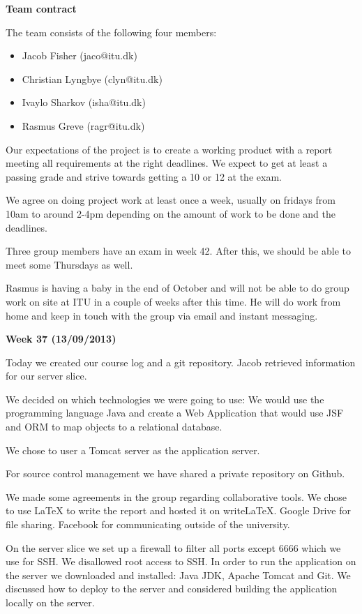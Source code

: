 \textbf{Team contract}

The team consists of the following four members:
\begin{itemize}
\item{Jacob Fisher (jaco@itu.dk)}
\item{Christian Lyngbye (clyn@itu.dk)}
\item{Ivaylo Sharkov (isha@itu.dk)}
\item{Rasmus Greve (ragr@itu.dk)}
\end{itemize}
Our expectations of the project is to create a working product with a report meeting all requirements at the right deadlines. We expect to get at least a passing grade and strive towards getting a 10 or 12 at the exam.

We agree on doing project work at least once a week, usually on fridays from 10am to around 2-4pm depending on the amount of work to be done and the deadlines.

Three group members have an exam in week 42. After this, we should be able to meet some Thursdays as well.

Rasmus is having a baby in the end of October and will not be able to do group work on site at ITU in a couple of weeks after this time. He will do work from home and keep in touch with the group via email and instant messaging.

\textbf{Week 37 (13/09/2013)}

Today we created our course log and a git repository.
Jacob retrieved information for our server slice.

We decided on which technologies we were going to use:
We would use the programming language Java and create a Web Application that would use JSF and ORM to map objects to a relational database.

We chose to user a Tomcat server as the application server.

For source control management we have shared a private repository on Github.

We made some agreements in the group regarding collaborative tools.
We chose to use LaTeX to write the report and hosted it on writeLaTeX.
Google Drive for file sharing.
Facebook for communicating outside of the university.

On the server slice we set up a firewall to filter all ports except 6666 which we use for SSH.
We disallowed root access to SSH.
In order to run the application on the server we downloaded and installed: Java JDK, Apache Tomcat and Git.
We discussed how to deploy to the server and considered building the application locally on the server.

